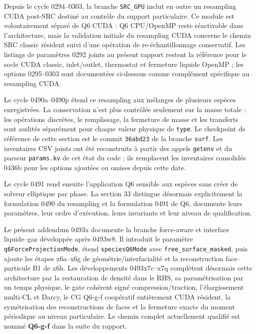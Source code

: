 \documentclass[11pt,a4paper]{article}
\begin{document}
Depuis le cycle 0294--0303, la branche \texttt{SRC\_GPU} inclut en outre un resampling CUDA post-SRC destiné au contrôle du support particulaire. Ce module est volontairement séparé de Q6 CUDA : Q6 CPU/OpenMP reste réactivable dans l'architecture, mais la validation initiale du resampling CUDA concerne le chemin SRC classic résident suivi d'une opération de re-échantillonnage conservatif. Les listings de paramètres 0292 joints au présent rapport restent la référence pour le socle CUDA classic, inlet/outlet, thermostat et fermeture liquide OpenMP ; les options 0295--0303 sont documentées ci-dessous comme complément spécifique au resampling CUDA.


Le cycle 0490a--0490p étend ce resampling aux mélanges de plusieurs espèces enregistrées. La conservation n'est plus contrôlée seulement sur la masse totale : les opérations discrètes, le remplissage, la fermeture de masse et les transferts sont audités séparément pour chaque valeur physique de \texttt{type}. Le checkpoint de référence de cette section est le commit \texttt{36abd23} de la branche \texttt{surf}. Les inventaires CSV joints ont été reconstruits à partir des appels \texttt{getenv} et du parseur \texttt{params.kv} de cet état du code ; ils remplacent les inventaires consolidés 0436b pour les options ajoutées ou omises depuis cette date.

Le cycle 0491 rend ensuite l'application Q6 sensible aux espèces sans créer de solveur elliptique par phase. La section 33 distingue désormais explicitement la formulation 0490 du resampling et la formulation 0491 de Q6, documente leurs paramètres, leur ordre d'exécution, leurs invariants et leur niveau de qualification.

Le présent addendum 0493x documente la branche force-aware et interface liquide--gaz développée après 0493w8. Il introduit le paramètre \texttt{q6ForceProjectionMode}, étend \texttt{speciesQ6Mode} avec \texttt{free\_surface\_masked}, puis ajoute les étapes x6a--x6g de géométrie/interfacialité et la reconstruction face--particule B1 de x6h. Les développements 0493x7c--x7q complètent désormais cette architecture par la restauration de densité dans le RHS, sa paramétrisation par un temps physique, le gate cohérent signé compression/traction, l'élargissement multi-CL et Darcy, le CG Q6-g-f coopératif entièrement CUDA résident, la symétrisation des reconstructions de faces et la fermeture exacte du moment périodique au niveau particulaire. Le chemin complet actuellement qualifié est nommé \textbf{Q6-g-f} dans la suite du rapport.
\end{document}
